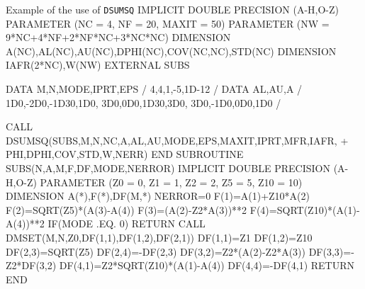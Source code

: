 \begin{XMPt}{Example of the use of {\tt DSUMSQ}}
      IMPLICIT DOUBLE PRECISION (A-H,O-Z)
      PARAMETER (NC = 4, NF = 20, MAXIT = 50)
      PARAMETER (NW = 9*NC+4*NF+2*NF*NC+3*NC*NC)
      DIMENSION A(NC),AL(NC),AU(NC),DPHI(NC),COV(NC,NC),STD(NC)
      DIMENSION IAFR(2*NC),W(NW)
      EXTERNAL SUBS
 
      DATA M,N,MODE,IPRT,EPS / 4,4,1,-5,1D-12 /
      DATA AL,AU,A / 1D0,-2D0,-1D30,1D0, 3D0,0D0,1D30,3D0, 3D0,-1D0,0D0,1D0 /
 
      CALL DSUMSQ(SUBS,M,N,NC,A,AL,AU,MODE,EPS,MAXIT,IPRT,MFR,IAFR,
     +            PHI,DPHI,COV,STD,W,NERR)
      END
      SUBROUTINE SUBS(N,A,M,F,DF,MODE,NERROR)
      IMPLICIT DOUBLE PRECISION (A-H,O-Z)
      PARAMETER (Z0 = 0, Z1 = 1, Z2 = 2, Z5 = 5, Z10 = 10)
      DIMENSION A(*),F(*),DF(M,*)
      NERROR=0
      F(1)=A(1)+Z10*A(2)
      F(2)=SQRT(Z5)*(A(3)-A(4))
      F(3)=(A(2)-Z2*A(3))**2
      F(4)=SQRT(Z10)*(A(1)-A(4))**2
      IF(MODE .EQ. 0) RETURN
      CALL DMSET(M,N,Z0,DF(1,1),DF(1,2),DF(2,1))
      DF(1,1)=Z1
      DF(1,2)=Z10
      DF(2,3)=SQRT(Z5)
      DF(2,4)=-DF(2,3)
      DF(3,2)=Z2*(A(2)-Z2*A(3))
      DF(3,3)=-Z2*DF(3,2)
      DF(4,1)=Z2*SQRT(Z10)*(A(1)-A(4))
      DF(4,4)=-DF(4,1)
      RETURN
      END
\end{XMPt}
 
